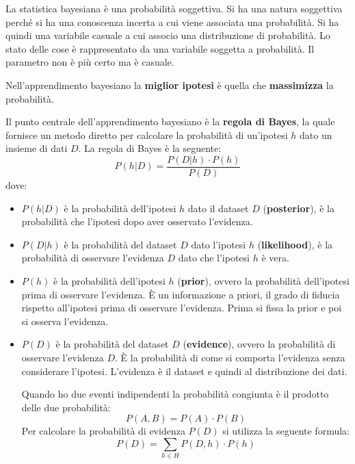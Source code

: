 La statistica bayesiana è una probabilità soggettiva. Si ha una natura soggettiva
perché si ha una conoscenza incerta a cui viene associata una probabilità. Si
ha quindi una variabile casuale a cui associo una distribuzione di probabilità.
Lo stato delle cose è rappresentato da una variabile soggetta a probabilità.
Il parametro non è più certo ma è casuale.

Nell'apprendimento bayesiano la \textbf{miglior ipotesi} è quella che \textbf{massimizza} la probabilità.

Il punto centrale dell'apprendimento bayesiano è la \textbf{regola di Bayes},
la quale fornisce un metodo diretto per calcolare la probabilità di un'ipotesi
$h$ dato un insieme di dati $D$. La regola di Bayes è la seguente:
\begin{equation}
    P(h|D) = \frac{P(D|h) \cdot P(h)}{P(D)}
\end{equation}
dove:
\begin{itemize}
    \item $P(h|D)$ è la probabilità dell'ipotesi $h$ dato il dataset $D$
          (\textbf{posterior}), è la probabilità che l'ipotesi  dopo aver osservato
          l'evidenza.
    \item $P(D|h)$ è la probabilità del dataset $D$ dato l'ipotesi $h$
          (\textbf{likelihood}), è la probabilità di osservare l'evidenza $D$ dato che
          l'ipotesi $h$ è vera.
    \item $P(h)$ è la probabilità dell'ipotesi $h$ (\textbf{prior}), ovvero la
          probabilità dell'ipotesi prima di osservare l'evidenza. È un informazione
          a priori, il grado di fiducia rispetto all'ipotesi prima di osservare
          l'evidenza. Prima si fissa la prior e poi si osserva l'evidenza.
    \item $P(D)$ è la probabilità del dataset $D$ (\textbf{evidence}), ovvero
          la probabilità di osservare l'evidenza $D$. È la probabilità di come si
          comporta l'evidenza senza considerare l'ipotesi. L'evidenza è il dataset e 
          quindi al distribuzione dei dati.

          Quando ho due eventi indipendenti la probabilità congiunta è il prodotto
          delle due probabilità:
          \begin{equation}
              P(A, B) = P(A) \cdot P(B)
          \end{equation}
          Per calcolare la probabilità di evidenza $P(D)$ si utilizza la seguente
          formula:
          \begin{equation}
              P(D) = \sum_{h \in H} P(D, h) \cdot P(h)
          \end{equation}
\end{itemize}

